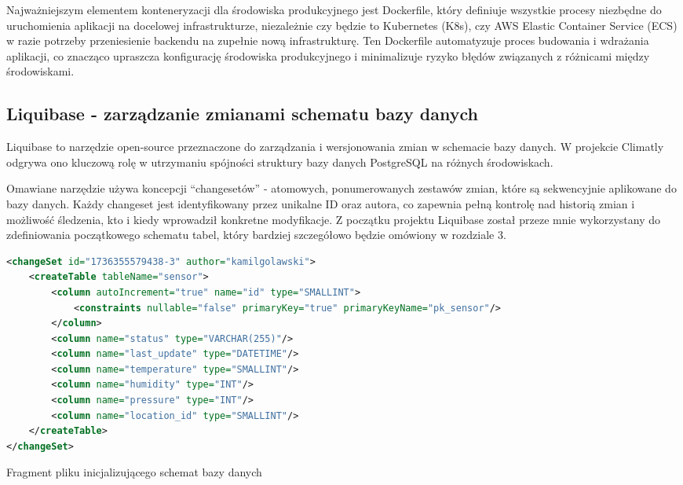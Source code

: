 \documentclass[a4paper,12pt,openany]{book}
\begin{document}
Najważniejszym elementem konteneryzacji dla środowiska produkcyjnego jest Dockerfile, który definiuje wszystkie procesy niezbędne do uruchomienia aplikacji na docelowej infrastrukturze, niezależnie czy będzie to Kubernetes (K8s), czy AWS Elastic Container Service (ECS) w razie potrzeby przeniesienie backendu na zupełnie nową infrastrukturę. Ten Dockerfile automatyzuje proces budowania i wdrażania aplikacji, co znacząco upraszcza konfigurację środowiska produkcyjnego i minimalizuje ryzyko błędów związanych z różnicami między środowiskami.


\clearpage

\subsection*{Liquibase - zarządzanie zmianami schematu bazy danych}

Liquibase to narzędzie open-source przeznaczone do zarządzania i wersjonowania zmian w schemacie bazy danych. W projekcie Climatly odgrywa ono kluczową rolę w utrzymaniu spójności struktury bazy danych PostgreSQL na różnych środowiskach.

Omawiane narzędzie używa koncepcji ``changesetów'' - atomowych, ponumerowanych zestawów zmian, które są sekwencyjnie aplikowane do bazy danych. Każdy changeset jest identyfikowany przez unikalne ID oraz autora, co zapewnia pełną kontrolę nad historią zmian i możliwość śledzenia, kto i kiedy wprowadził konkretne modyfikacje. Z początku projektu Liquibase został przeze mnie wykorzystany do zdefiniowania początkowego schematu tabel, który bardziej szczegółowo będzie omówiony w rozdziale 3.

\begin{lstfloat}[htbp]
\begin{lstlisting}[language=xml]
<changeSet id="1736355579438-3" author="kamilgolawski">
    <createTable tableName="sensor">
        <column autoIncrement="true" name="id" type="SMALLINT">
            <constraints nullable="false" primaryKey="true" primaryKeyName="pk_sensor"/>
        </column>
        <column name="status" type="VARCHAR(255)"/>
        <column name="last_update" type="DATETIME"/>
        <column name="temperature" type="SMALLINT"/>
        <column name="humidity" type="INT"/>
        <column name="pressure" type="INT"/>
        <column name="location_id" type="SMALLINT"/>
    </createTable>
</changeSet>
\end{lstlisting}
\caption{Fragment pliku inicjalizującego schemat bazy danych}
\label{lst:liquibase-init}
\end{lstfloat}
\end{document}
